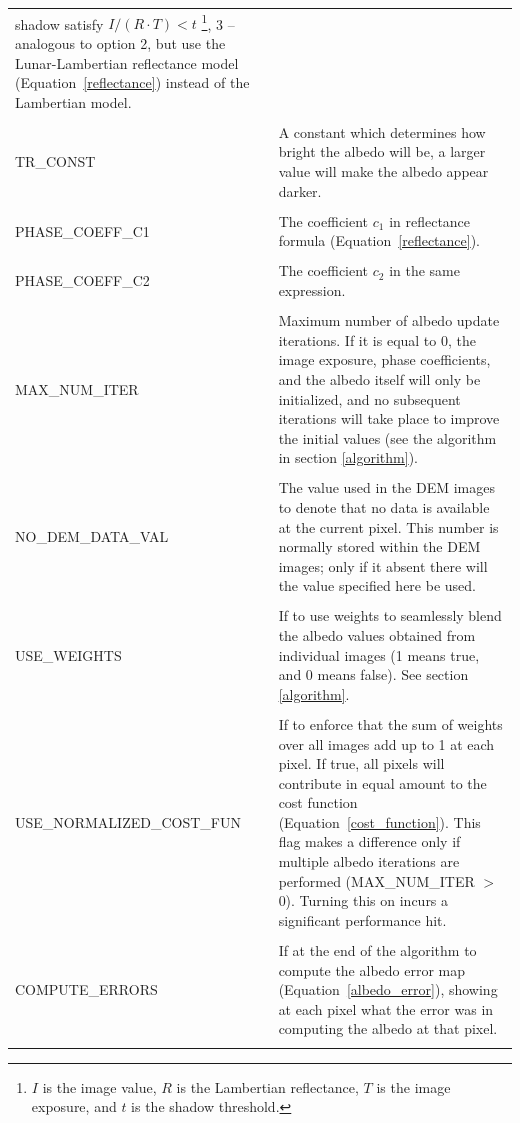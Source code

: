 \documentclass[letterpaper,fleqn,11pt]{report}
\begin{document}
\begin{longtable}{ l p{7cm} }
shadow satisfy $I/(R\cdot T) < t$ \footnote{$I$ is the
image value, $R$ is the Lambertian reflectance, $T$ is the image
exposure, and $t$ is the shadow threshold.}, 3 -- 
analogous to option 2, but use the Lunar-Lambertian reflectance model (Equation~\ref{reflectance})
instead of the Lambertian model.\\
\\
TR\_CONST & A constant which determines how bright the albedo will be, a larger value will make the albedo 
appear darker. \\
\\
PHASE\_COEFF\_C1  & The coefficient $c_1$ in reflectance formula (Equation~\ref{reflectance}).\\
\\
PHASE\_COEFF\_C2  & The coefficient $c_2$ in the same expression.\\
\\
MAX\_NUM\_ITER     &
Maximum number of albedo update iterations. If it is equal to 0, the image
exposure, phase coefficients, and the albedo itself will only be
initialized, and no subsequent iterations will take place to improve
the initial values (see the algorithm in section \ref{algorithm}).\\ 
\\
NO\_DEM\_DATA\_VAL &
The value used in the DEM images to denote that no data is available at the
current pixel. This number is normally stored within the DEM images;
only if it absent there will the value specified here be used.\\
\\
USE\_WEIGHTS &
 If to use weights to seamlessly blend the albedo values obtained from
 individual images (1 means true, and 0 means false). See section \ref{algorithm}.\\
\\
USE\_NORMALIZED\_COST\_FUN &
 If to enforce that the sum of weights over all images add up to 1 at
 each pixel.  If true, all pixels will contribute in equal amount to
 the cost function (Equation~\ref{cost_function}). This flag makes a difference only if multiple
 albedo iterations are performed (MAX\_NUM\_ITER $>$ 0). Turning this
 on incurs a significant performance hit.\\
\\
COMPUTE\_ERRORS   &
 If at the end of the algorithm to compute the albedo error map (Equation~\ref{albedo_error}), showing at each pixel what the error was in computing the albedo at that pixel.\\
\\

\end{longtable}
\end{document}
